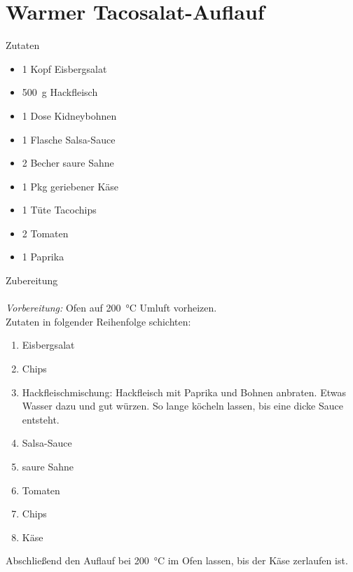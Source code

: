\section*{Warmer Tacosalat-Auflauf}
\ihead{}\ohead{}
\cfoot{}
{\Large Zutaten}
\begin{multicols}{2}
\begin{itemize}
    \item \num{1} Kopf Eisbergsalat
    \item \SI{500}{g} Hackfleisch
    \item \num{1} Dose Kidneybohnen
    \item \num{1} Flasche Salsa-Sauce
    \item \num{2} Becher saure Sahne
    \item \num{1} Pkg geriebener Käse
    \item \num{1} Tüte Tacochips
    \item \num{2} Tomaten
    \item \num{1} Paprika
\end{itemize}
\end{multicols}
\noindent
{\Large Zubereitung}\\
\\
\textit{Vorbereitung:} Ofen auf \SI{200}{\celsius} Umluft vorheizen.\\
Zutaten in folgender Reihenfolge schichten:
\begin{enumerate}
    \item Eisbergsalat
    \item Chips
    \item Hackfleischmischung: Hackfleisch mit Paprika und Bohnen anbraten. 
        Etwas Wasser dazu und gut würzen.
        So lange köcheln lassen, bis eine dicke Sauce entsteht.
    \item Salsa-Sauce
    \item saure Sahne
    \item Tomaten
    \item Chips
    \item Käse
\end{enumerate}
Abschließend den Auflauf bei \SI{200}{\celsius} im Ofen lassen, bis der Käse zerlaufen ist.